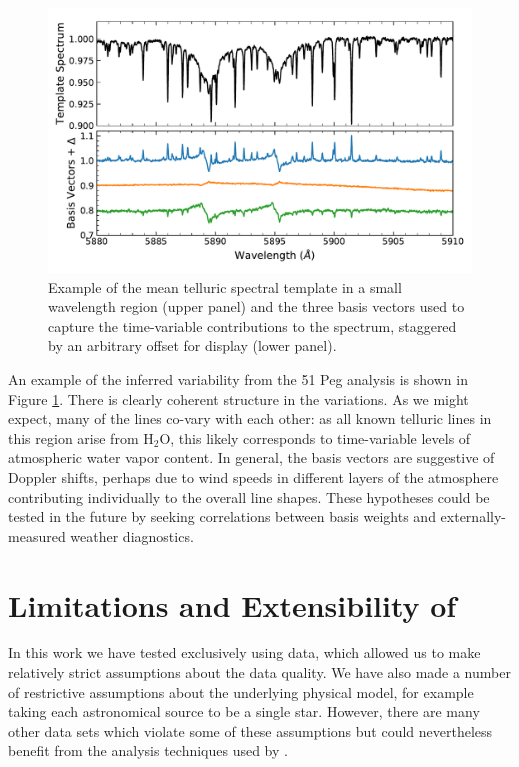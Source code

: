 \documentclass[modern]{aastex62}
\begin{document}
{\begin{figure}
\centering
\includegraphics[width=5in]{telluric_basis2}
\caption{Example of the mean telluric spectral template in a small wavelength region (upper panel) and the three basis vectors used to capture the time-variable contributions to the spectrum, staggered by an arbitrary offset for display (lower panel).}
\label{fig:telluric_basis}
\end{figure}

An example of the inferred variability from the 51 Peg analysis is shown in Figure \ref{fig:telluric_basis}. 
There is clearly coherent structure in the variations. 
As we might expect, many of the lines co-vary with each other: as all known telluric lines in this region arise from H$_2$O, this likely corresponds to time-variable levels of atmospheric water vapor content. 
In general, the basis vectors are suggestive of Doppler shifts, perhaps due to wind speeds in different layers of the atmosphere contributing individually to the overall line shapes. 
These hypotheses could be tested in the future by seeking correlations between basis weights and externally-measured weather diagnostics. 


\section{Limitations and Extensibility of \wobble}
\label{s:future}

In this work we have tested \wobble exclusively using \HARPS data, which allowed us to make relatively strict assumptions about the data quality. 
We have also made a number of restrictive assumptions about the underlying physical model, for example taking each astronomical source to be a single star. 
However, there are many other \EPRV data sets which violate some of these assumptions but could nevertheless benefit from the analysis techniques used by \wobble.
 
}
\end{document}
